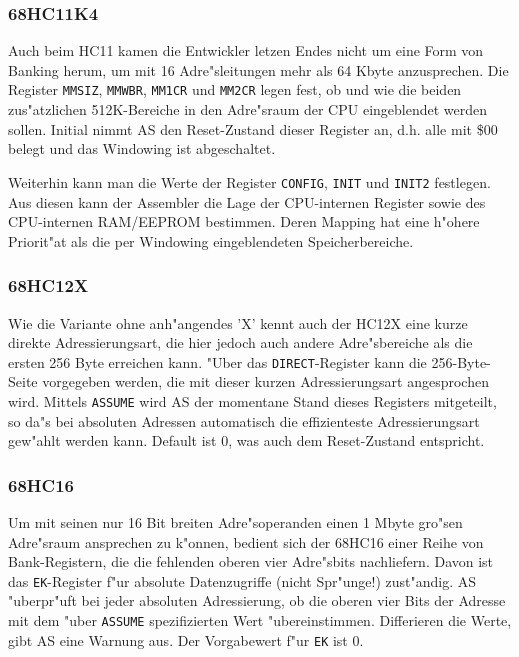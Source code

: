 \documentclass[12pt,a4paper,twoside]{report}
\newcommand{\tty}[1]{{\tt #1}}
\begin{document}

\subsubsection{68HC11K4}

Auch beim HC11 kamen die Entwickler letzen Endes nicht um eine Form von
Banking herum, um mit 16 Adre"sleitungen mehr als 64 Kbyte anzusprechen.  Die
Register {\tt MMSIZ}, {\tt MMWBR}, {\tt MM1CR} und {\tt MM2CR} legen fest,
ob und wie die beiden zus"atzlichen 512K-Bereiche in den Adre"sraum der CPU
eingeblendet werden sollen.  Initial nimmt AS den Reset-Zustand
dieser Register an, d.h. alle mit \$00 belegt und das Windowing ist
abgeschaltet.

Weiterhin kann man die Werte der Register {\tt CONFIG}, {\tt INIT} und {\tt INIT2}
festlegen.  Aus diesen kann der Assembler die Lage der CPU-internen Register sowie
des CPU-internen RAM/EEPROM bestimmen.  Deren Mapping hat eine h"ohere Priorit"at
als die per Windowing eingeblendeten Speicherbereiche.


\subsubsection{68HC12X}

Wie die Variante ohne anh"angendes 'X' kennt auch der HC12X eine kurze
direkte Adressierungsart, die hier jedoch auch andere Adre"sbereiche als
die ersten 256 Byte erreichen kann.  "Uber das {\tt DIRECT}-Register kann
die 256-Byte-Seite vorgegeben werden, die mit dieser kurzen
Adressierungsart angesprochen wird.  Mittels {\tt ASSUME} wird AS der
momentane Stand dieses Registers mitgeteilt, so da"s bei absoluten
Adressen automatisch die effizienteste Adressierungsart gew"ahlt werden
kann.  Default ist 0, was auch dem Reset-Zustand entspricht.

\subsubsection{68HC16}

Um mit seinen nur 16 Bit breiten Adre"soperanden einen 1 Mbyte gro"sen
Adre"sraum ansprechen zu k"onnen, bedient sich der 68HC16 einer Reihe
von Bank-Registern, die die fehlenden oberen vier Adre"sbits nachliefern.
Davon ist das \tty{EK}-Register f"ur absolute Datenzugriffe (nicht
Spr"unge!) zust"andig.  AS "uberpr"uft bei jeder absoluten Adressierung,
ob die oberen vier Bits der Adresse mit dem "uber \tty{ASSUME}
spezifizierten Wert "ubereinstimmen.  Differieren die Werte, gibt AS eine
Warnung aus.  Der Vorgabewert f"ur \tty{EK} ist 0.
\end{document}
